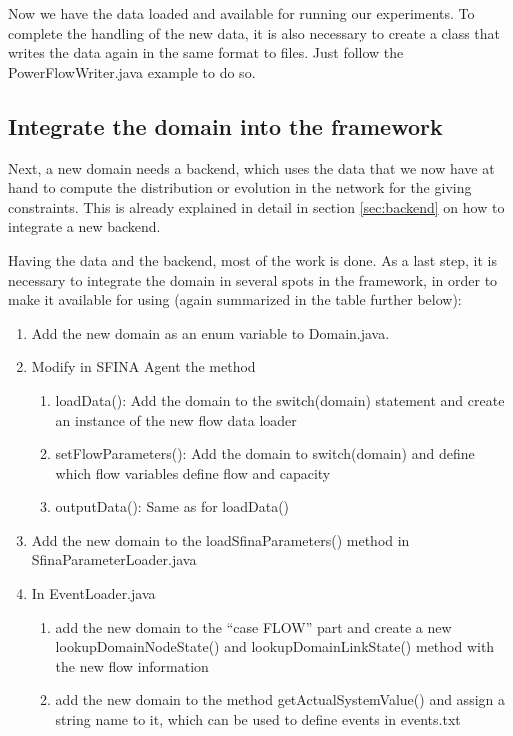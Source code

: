 \documentclass[11pt,fleqn]{book} %
\begin{document}
Now we have the data loaded and available for running our experiments. To complete the handling of the new data, it is also necessary to create a class that writes the data again in the same format to files. Just follow the PowerFlowWriter.java example to do so.

\subsection{Integrate the domain into the framework}
Next, a new domain needs a backend, which uses the data that we now have at hand to compute the distribution or evolution in the network for the giving constraints. This is already explained in detail in section \ref{sec:backend} on how to integrate a new backend.

Having the data and the backend, most of the work is done. As a last step, it is necessary to integrate the domain in several spots in the framework, in order to make it available for using (again summarized in the table further below):
\begin{enumerate}
	\item Add the new domain as an enum variable to Domain.java.
	\item Modify in SFINA Agent the method
	\begin{enumerate}
		\item loadData(): Add the domain to the switch(domain) statement and create an instance of the new flow data loader
		\item setFlowParameters(): Add the domain to switch(domain) and define which flow variables define flow and capacity
		\item outputData(): Same as for loadData()
	\end{enumerate}
	\item Add the new domain to the loadSfinaParameters() method in SfinaParameterLoader.java
	\item In EventLoader.java 
	\begin{enumerate}
		\item add the new domain to the “case FLOW” part and create a new lookupDomainNodeState() and lookupDomainLinkState() method with the new flow information
		\item add the new domain to the method getActualSystemValue() and assign a string name to it, which can be used to define events in events.txt
		\end{enumerate}
\end{enumerate}
\end{document}
